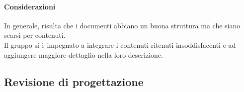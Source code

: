 	\paragraph{Considerazioni}
		In generale, risulta che i documenti abbiano un buona struttura ma che siano scarsi per contenuti. \\
		Il gruppo si è impegnato a integrare i contenuti ritenuti insoddisfacenti e ad aggiungere maggiore dettaglio nella loro descrizione.
		
\subsection{Revisione di progettazione}